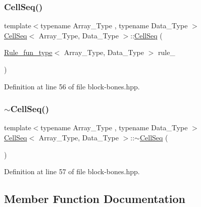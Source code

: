\subsubsection{\texorpdfstring{Cell\+Seq()}{CellSeq()}\hspace{0.1cm}{\footnotesize\ttfamily [2/2]}}
{\footnotesize\ttfamily template$<$typename Array\+\_\+\+Type , typename Data\+\_\+\+Type $>$ \\
\hyperlink{class_cell_seq}{Cell\+Seq}$<$ Array\+\_\+\+Type, Data\+\_\+\+Type $>$\+::\hyperlink{class_cell_seq}{Cell\+Seq} (\begin{DoxyParamCaption}\item[{\hyperlink{typedefs_8hpp_a2e147c9c0e8b65be614c98a5dd400d5c}{Rule\+\_\+fun\+\_\+type}$<$ Array\+\_\+\+Type, Data\+\_\+\+Type $>$}]{rule\+\_\+ }\end{DoxyParamCaption})\hspace{0.3cm}{\ttfamily [inline]}}



Definition at line 56 of file block-\/bones.\+hpp.

\mbox{\label{class_cell_seq_aa52be587e92f0d246bd84980c3e8b540}} 
\subsubsection{\texorpdfstring{$\sim$\+Cell\+Seq()}{~CellSeq()}}
{\footnotesize\ttfamily template$<$typename Array\+\_\+\+Type , typename Data\+\_\+\+Type $>$ \\
\hyperlink{class_cell_seq}{Cell\+Seq}$<$ Array\+\_\+\+Type, Data\+\_\+\+Type $>$\+::$\sim$\hyperlink{class_cell_seq}{Cell\+Seq} (\begin{DoxyParamCaption}{ }\end{DoxyParamCaption})\hspace{0.3cm}{\ttfamily [inline]}}



Definition at line 57 of file block-\/bones.\+hpp.



\subsection{Member Function Documentation}
\mbox{\label{class_cell_seq_a844b28a2053fd2c6810340a5a9aef945}} 

